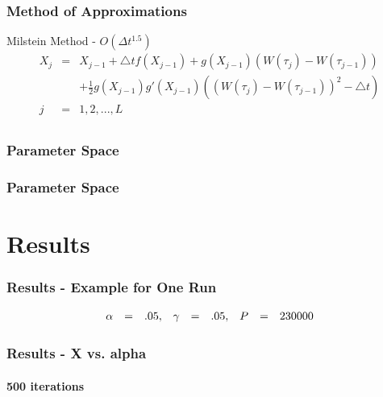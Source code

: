 \documentclass{beamer}   %
\begin{document}
\begin{frame}
  \frametitle{Method of Approximations}
  Milstein Method - $O(\Delta t^{1.5})$
  \begin{eqnarray*}
    X_{j} &=& X_{j-1} + \triangle tf(X_{j-1}) + g(X_{j-1})(W(\tau_{j})-W(\tau_{j-1}
    ))      \nonumber\\ 
    && + \frac{1}{2} g(X_{j-1})g'(X_{j-1})((W(\tau_{j})-W(\tau_{j-1}))^{2}-\triangle t)\\
    j &=& 1,2,... ,L \\
  \end{eqnarray*}
\end{frame}



\begin{frame}
  \frametitle{Parameter Space}
  \hspace*{-1cm}
\end{frame}

\begin{frame}
  \frametitle{Parameter Space}
  \hspace*{-1cm}
\end{frame}


\section{Results}

\begin{frame}
  \frametitle{Results - Example for One Run}
  \vspace*{-1cm}
  \begin{eqnarray*}
    \begin{array}{r c l r c l r c l}
      \alpha &=& .05, & \gamma &=& .05, & P &=& 230000
    \end{array}
  \end{eqnarray*}
  \hspace*{-2cm}
\end{frame}


\begin{frame}
  \frametitle{Results - X vs. alpha }
  \framesubtitle{500 iterations}
  \hspace*{-5mm}
\end{frame}
\end{document}
